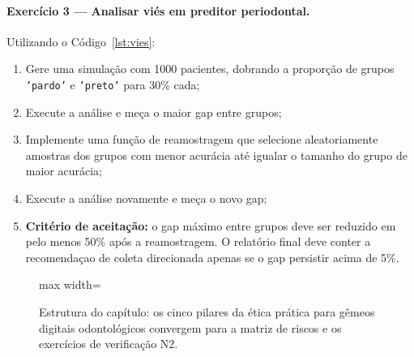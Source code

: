 \paragraph{Exercício 3 — Analisar viés em preditor periodontal.}
Utilizando o Código~\ref{lst:vies}:
\begin{enumerate}
    \item Gere uma simulação com 1000 pacientes, dobrando a proporção de grupos \texttt{'pardo'} e \texttt{'preto'} para 30\% cada;
    \item Execute a análise e meça o maior gap entre grupos;
    \item Implemente uma função de reamostragem que selecione aleatoriamente amostras dos grupos com menor acurácia até igualar o tamanho do grupo de maior acurácia;
    \item Execute a análise novamente e meça o novo gap;
    \item \textbf{Critério de aceitação:} o gap máximo entre grupos deve ser reduzido em pelo menos 50\% após a reamostragem. O relatório final deve conter a recomendaçao de coleta direcionada apenas se o gap persistir acima de 5\%.
\end{enumerate}

\begin{figure}[htbp]
\centering
\begin{adjustbox}{max width=\textwidth}
\end{adjustbox}
\caption{Estrutura do capítulo: os cinco pilares da ética prática para gêmeos digitais odontológicos convergem para a matriz de riscos e os exercícios de verificação N2.}
\label{fig:etica-estrutura}
\end{figure}

